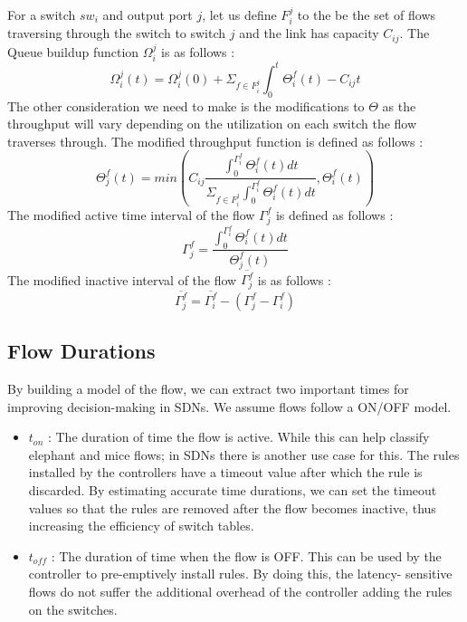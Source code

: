 \documentclass[]{article}
\begin{document}
For a switch $sw_i$ and output port $j$, let us define $F_i^j$ to the be the set of flows 
traversing through the switch to switch $j$ and the link has capacity $C_{ij}$. The Queue
buildup function $\Omega_i^j$ is as follows : 
\[ 
\Omega_i^j(t) = \Omega_i^j(0) + \Sigma_{f \in F_i^j} \int_{0}^{t}\Theta_i^f(t) - C_{ij}t 
\]
The other consideration we need to make is the modifications to $\Theta$ as the
throughput will vary depending on the utilization on each switch the flow traverses
through. The modified throughput function is defined as follows : 
\[
\Theta_j^f(t) = min(C_{ij} \frac{\int_{0}^{\Gamma^f_i}\Theta_i^f(t)dt}
							   {\Sigma_{f \in F_i^j}{\int_{0}^{\Gamma^f_i}\Theta_i^f(t)dt}},
							\Theta_i^f(t))
\]
The modified active time interval of the flow $\Gamma_j^f$ is defined as follows : 
\[
\Gamma_j^f = \frac{\int_{0}^{\Gamma^f_i}\Theta_i^f(t)dt}
							{\Theta_j^f(t)}
\]
The modified inactive interval of the flow $\overline{\Gamma_j^f}$ is as follows : 
\[
\overline{\Gamma_j^f} = \overline{\Gamma_i^f} - (\Gamma_j^f - \Gamma_i^f)
\]

\subsection{Flow Durations}
By building a model of the flow, we can extract two important 
times for improving decision-making in SDNs. We assume flows follow
a ON/OFF model.
\begin{itemize}
	\item $t_{on}$ : The duration of time the flow is active. While this can
	help classify elephant and mice flows; in SDNs there is another use case
	for this. The rules installed by the controllers have a timeout value after which
	the rule is discarded. By estimating accurate time durations, we can set the 
	timeout values so that the rules are removed after the flow becomes inactive,
	thus increasing the efficiency of switch tables.
	\item $t_{off}$ : The duration of time when the flow is OFF. This can be used
	by the controller to pre-emptively install rules. By doing this, the latency-
	sensitive flows do not suffer the additional overhead of the controller
	adding the rules on the switches. 
\end{itemize}
\end{document}
